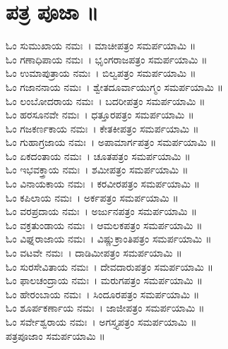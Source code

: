 \section{ಪತ್ರ ಪೂಜಾ ॥}
ಓಂ ಸುಮುಖಾಯ ನಮಃ~। ಮಾಚೀಪತ್ರಂ ಸಮರ್ಪಯಾಮಿ ॥\\
ಓಂ ಗಣಾಧಿಪಾಯ ನಮಃ~। ಭೃಂಗರಾಜಪತ್ರಂ ಸಮರ್ಪಯಾಮಿ ॥\\
ಓಂ ಉಮಾಪುತ್ರಾಯ ನಮಃ~। ಬಿಲ್ವಪತ್ರಂ ಸಮರ್ಪಯಾಮಿ ॥\\
ಓಂ ಗಜಾನನಾಯ ನಮಃ~। ಶ್ವೇತದೂರ್ವಾಯುಗ್ಮಂ ಸಮರ್ಪಯಾಮಿ ॥\\
ಓಂ ಲಂಬೋದರಾಯ ನಮಃ~। ಬದರೀಪತ್ರಂ ಸಮರ್ಪಯಾಮಿ ॥\\
ಓಂ ಹರಸೂನವೇ ನಮಃ~। ಧತ್ತೂರಪತ್ರಂ ಸಮರ್ಪಯಾಮಿ ॥\\
ಓಂ ಗಜಕರ್ಣಕಾಯ ನಮಃ~। ಕೇತಕೀಪತ್ರಂ ಸಮರ್ಪಯಾಮಿ ॥\\
ಓಂ ಗುಹಾಗ್ರಜಾಯ ನಮಃ~। ಅಪಾಮಾರ್ಗಪತ್ರಂ ಸಮರ್ಪಯಾಮಿ ॥\\
ಓಂ ಏಕದಂತಾಯ ನಮಃ~। ಚೂತಪತ್ರಂ ಸಮರ್ಪಯಾಮಿ ॥\\
ಓಂ ಇಭವಕ್ತ್ರಾಯ ನಮಃ~। ಶಮೀಪತ್ರಂ ಸಮರ್ಪಯಾಮಿ ॥\\
ಓಂ ವಿನಾಯಕಾಯ ನಮಃ~। ಕರವೀರಪತ್ರಂ ಸಮರ್ಪಯಾಮಿ ॥\\
ಓಂ ಕಪಿಲಾಯ ನಮಃ~। ಅರ್ಕಪತ್ರಂ ಸಮರ್ಪಯಾಮಿ ॥\\
ಓಂ ವರಪ್ರದಾಯ ನಮಃ~। ಅರ್ಜುನಪತ್ರಂ ಸಮರ್ಪಯಾಮಿ ॥\\
ಓಂ ವಕ್ರತುಂಡಾಯ ನಮಃ~। ಆಮಲಕಪತ್ರಂ ಸಮರ್ಪಯಾಮಿ ॥\\
ಓಂ ವಿಘ್ನರಾಜಾಯ ನಮಃ~। ವಿಷ್ಣುಕ್ರಾಂತಿಪತ್ರಂ ಸಮರ್ಪಯಾಮಿ ॥\\
ಓಂ ವಟವೇ ನಮಃ~। ದಾಡಿಮೀಪತ್ರಂ ಸಮರ್ಪಯಾಮಿ ॥\\
ಓಂ ಸುರಸೇವಿತಾಯ ನಮಃ~। ದೇವದಾರುಪತ್ರಂ ಸಮರ್ಪಯಾಮಿ ॥\\
ಓಂ ಫಾಲಚಂದ್ರಾಯ ನಮಃ~। ಮರುಗಪತ್ರಂ ಸಮರ್ಪಯಾಮಿ ॥\\
ಓಂ ಹೇರಂಬಾಯ ನಮಃ~। ಸಿಂದೂರಪತ್ರಂ ಸಮರ್ಪಯಾಮಿ ॥\\
ಓಂ ಶೂರ್ಪಕರ್ಣಾಯ ನಮಃ~। ಜಾಜೀಪತ್ರಂ ಸಮರ್ಪಯಾಮಿ ॥\\
ಓಂ ಸರ್ವೇಶ್ವರಾಯ ನಮಃ~। ಅಗಸ್ತ್ಯಪತ್ರಂ ಸಮರ್ಪಯಾಮಿ ॥\\
ಪತ್ರಪೂಜಾಂ ಸಮರ್ಪಯಾಮಿ ॥
